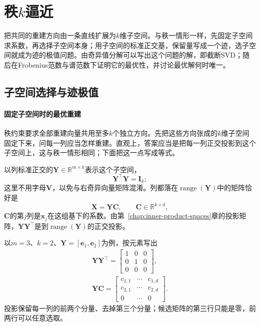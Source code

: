 
\section{秩\texorpdfstring{$k$}{k}逼近}
\label{sec:ls-low-rank-approximation}
\label{sec:ls-low-rank-solve}
\label{sec:ls-full-svd-solve}
\label{sec:matrix-analysis-svd-low-rank}

把共同的重建方向由一条直线扩展为$k$维子空间。与秩一情形一样，先固定子空间求系数，再选择子空间本身；用子空间的标准正交基，保留量写成一个迹，选子空间就成为迹的极值问题。由奇异值分解可以写出这个问题的解，即截断SVD；随后在Frobenius范数与谱范数下证明它的最优性，并讨论最优解何时唯一。

\subsection{子空间选择与迹极值}
\label{sec:ls-low-rank-projection-error}
\label{sec:ls-rank-k-trace}

\paragraph{固定子空间时的最优重建}
秩约束要求全部重建向量共用至多$k$个独立方向。先把这些方向张成的$k$维子空间固定下来，问每一列应当怎样重建。直观上，答案应当是把每一列正交投影到这个子空间上，这与秩一情形相同；下面把这一点写成等式。

以列标准正交的$\bm Y\in\mathbb R^{m\times k}$表示这个子空间，
\[
 \bm Y^\top\bm Y=\bm I_k ;
\]
这里不用字母$\bm V$，以免与右奇异向量矩阵混淆。列都落在$\operatorname{range}(\bm Y)$中的矩阵恰好是
\[
 \bm X=\bm Y\bm C,\qquad \bm C\in\mathbb R^{k\times d},
\]
$\bm C$的第$j$列是$\bm x_j$在这组基下的系数。由第~\ref{chap:inner-product-spaces}章的投影矩阵，$\bm Y\bm Y^\top$是到$\operatorname{range}(\bm Y)$的正交投影。

以$m=3$、$k=2$、$\bm Y=[\bm e_1,\bm e_2]$为例，按元素写出
\[
 \begin{gathered}
 \bm Y\bm Y^\top=\begin{bmatrix}1&0&0\\0&1&0\\0&0&0\end{bmatrix},\\
 \bm Y\bm C=\begin{bmatrix}c_{1,1}&\cdots&c_{1,d}\\c_{2,1}&\cdots&c_{2,d}\\0&\cdots&0\end{bmatrix}.
 \end{gathered}
\]
投影保留每一列的前两个分量、去掉第三个分量；候选矩阵的第三行只能是零，前两行可以任意选取。

